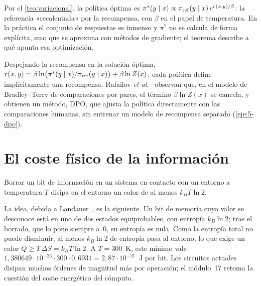 Por el \cref{teo:variacional}, la política óptima es $\pi^{*}(y\mid x)\propto\pi_{\mathrm{ref}}(y\mid x)\,e^{r(x,y)/\beta}$: la referencia «recalentada» por la recompensa, con $\beta$ en el papel de temperatura. En la práctica el conjunto de respuestas es inmenso y $\pi^{*}$ no se calcula de forma explícita, sino que se aproxima con métodos de gradiente; el teorema describe a qué apunta esa optimización.

\addtocounter{definicion}{1}%

\begin{observacion}
Despejando la recompensa en la solución óptima, $r(x,y)=\beta\ln\bigl(\pi^{*}(y\mid x)/\pi_{\mathrm{ref}}(y\mid x)\bigr)+\beta\ln Z(x)$: cada política define implícitamente una recompensa. Rafailov \emph{et al.}~\cite{dpo} observan que, en el modelo de Bradley--Terry de comparaciones por pares, el término $\beta\ln Z(x)$ se cancela, y obtienen un método, DPO, que ajusta la política directamente con las comparaciones humanas, sin entrenar un modelo de recompensa separado (\cref{eje:5-dpo}).
\end{observacion}

\section{El coste físico de la información}

\begin{proposicion}\label{prop:landauer}
Borrar un bit de información en un sistema en contacto con un entorno a temperatura $T$ disipa en el entorno un calor de al menos $k_BT\ln 2$.
\end{proposicion}

La idea, debida a Landauer~\cite{landauer}, es la siguiente. Un bit de memoria cuyo valor se desconoce está en uno de dos estados equiprobables, con entropía $k_B\ln 2$; tras el borrado, que lo pone siempre a~0, su entropía es nula. Como la entropía total no puede disminuir, al menos $k_B\ln 2$ de entropía pasa al entorno, lo que exige un calor $Q\ge T\,\Delta S=k_BT\ln 2$. A $T=300$~K, este mínimo vale $1{,}380649\cdot10^{-23}\cdot300\cdot0{,}6931=2{,}87\cdot10^{-21}$~J por bit. Los circuitos actuales disipan muchos órdenes de magnitud más por operación; el módulo~17 retoma la cuestión del coste energético del cómputo.

